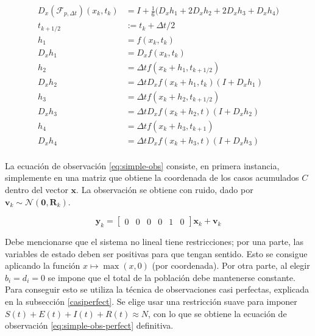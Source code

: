 \begin{equation}\label{eq:simple-jacobian}
\begin{aligned}
D_x(\mathcal{F}_{p, \Delta t})(x_k, t_k) &= I + \frac{1}{6}\Big( D_x h_1  +  2 D_x h_2 + 2D_x h_3 +D_x h_4\Big) \\
t_{k + 1/2} &:= t_k + \Delta t / 2\\
h_1 &= f(x_k, t_k) \\
D_x h_1 &= D_x f(x_k, t_k)\\
h_2 &= \Delta t f(x_k + h_1, t_{k + 1/2}) \\
D_x h_2 &= \Delta t D_x f(x_k + h_1, t_k) (I + D_x h_1)  \\
h_3 &= \Delta t f(x_k + h_2, t_{k + 1/2}) \\
D_x h_3 &= \Delta t D_x f(x_k + h_2, t)(I + D_x h_2) \\
h_4 &= \Delta t f(x_k + h_3, t_{k + 1}) \\
D_x h_4 &= \Delta t D_x f(x_k + h_3, t)(I + D_x h_3) \\
\end{aligned}
\end{equation}


La ecuación de observación \ref{eq:simple-obs} consiste, en primera instancia, simplemente en una matriz que obtiene la coordenada de los casos acumulados \(C\) dentro del vector \(\mathbf{x}\). La observación se obtiene con ruido, dado por \(\mathbf{v}_{k} \sim \mathcal{N}(\mathbf{0}, \mathbf{R}_k)\). 


\begin{equation} \label{eq:simple-obs}
\mathbf{y}_{k} = 
\begin{bmatrix}0 & 0 & 0 & 0 & 1 & 0\end{bmatrix} \mathbf{x}_{k} + \mathbf{v}_k
\end{equation}

Debe mencionarse que el sistema no lineal tiene restricciones; por una parte, las variables de estado deben ser positivas para que tengan sentido. Esto se consigue aplicando la función \(x \mapsto \max(x, 0)\) (por coordenada). Por otra parte, al elegir \(b_i = d_i = 0\) se impone que el total de la población debe mantenerse constante. Para conseguir esto se utiliza la técnica de observaciones casi perfectas, explicada en la subsección \ref{casiperfect}. Se elige usar una restricción suave para imponer \(S(t) + E(t) + I(t) + R(t) \approx N\), con lo que se obtiene la ecuación de observación \ref{eq:simple-obs-perfect} definitiva.

